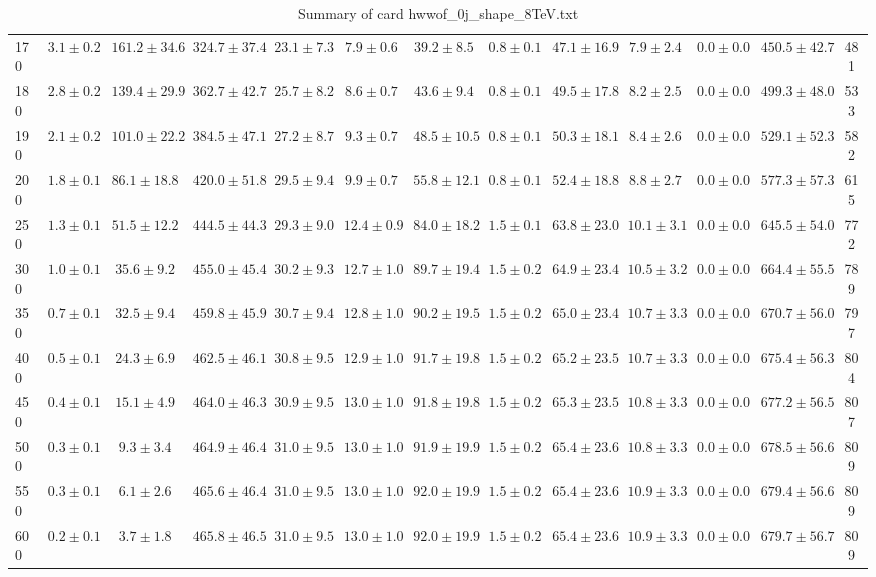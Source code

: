 \begin{table}
{\begin{center}
\begin{tabular}{l | c c | c c c c c c c c  | c c}
170 & $3.1\pm0.2$ & $161.2\pm34.6$ & $324.7\pm37.4$ & $23.1\pm7.3$ & $7.9\pm0.6$ & $39.2\pm8.5$ & $0.8\pm0.1$ & $47.1\pm16.9$ & $7.9\pm2.4$ & $0.0\pm0.0$ & $450.5\pm42.7$ & 481 \\
180 & $2.8\pm0.2$ & $139.4\pm29.9$ & $362.7\pm42.7$ & $25.7\pm8.2$ & $8.6\pm0.7$ & $43.6\pm9.4$ & $0.8\pm0.1$ & $49.5\pm17.8$ & $8.2\pm2.5$ & $0.0\pm0.0$ & $499.3\pm48.0$ & 533 \\
190 & $2.1\pm0.2$ & $101.0\pm22.2$ & $384.5\pm47.1$ & $27.2\pm8.7$ & $9.3\pm0.7$ & $48.5\pm10.5$ & $0.8\pm0.1$ & $50.3\pm18.1$ & $8.4\pm2.6$ & $0.0\pm0.0$ & $529.1\pm52.3$ & 582 \\
200 & $1.8\pm0.1$ & $86.1\pm18.8$ & $420.0\pm51.8$ & $29.5\pm9.4$ & $9.9\pm0.7$ & $55.8\pm12.1$ & $0.8\pm0.1$ & $52.4\pm18.8$ & $8.8\pm2.7$ & $0.0\pm0.0$ & $577.3\pm57.3$ & 615 \\
250 & $1.3\pm0.1$ & $51.5\pm12.2$ & $444.5\pm44.3$ & $29.3\pm9.0$ & $12.4\pm0.9$ & $84.0\pm18.2$ & $1.5\pm0.1$ & $63.8\pm23.0$ & $10.1\pm3.1$ & $0.0\pm0.0$ & $645.5\pm54.0$ & 772 \\
300 & $1.0\pm0.1$ & $35.6\pm9.2$ & $455.0\pm45.4$ & $30.2\pm9.3$ & $12.7\pm1.0$ & $89.7\pm19.4$ & $1.5\pm0.2$ & $64.9\pm23.4$ & $10.5\pm3.2$ & $0.0\pm0.0$ & $664.4\pm55.5$ & 789 \\
350 & $0.7\pm0.1$ & $32.5\pm9.4$ & $459.8\pm45.9$ & $30.7\pm9.4$ & $12.8\pm1.0$ & $90.2\pm19.5$ & $1.5\pm0.2$ & $65.0\pm23.4$ & $10.7\pm3.3$ & $0.0\pm0.0$ & $670.7\pm56.0$ & 797 \\
400 & $0.5\pm0.1$ & $24.3\pm6.9$ & $462.5\pm46.1$ & $30.8\pm9.5$ & $12.9\pm1.0$ & $91.7\pm19.8$ & $1.5\pm0.2$ & $65.2\pm23.5$ & $10.7\pm3.3$ & $0.0\pm0.0$ & $675.4\pm56.3$ & 804 \\
450 & $0.4\pm0.1$ & $15.1\pm4.9$ & $464.0\pm46.3$ & $30.9\pm9.5$ & $13.0\pm1.0$ & $91.8\pm19.8$ & $1.5\pm0.2$ & $65.3\pm23.5$ & $10.8\pm3.3$ & $0.0\pm0.0$ & $677.2\pm56.5$ & 807 \\
500 & $0.3\pm0.1$ & $9.3\pm3.4$ & $464.9\pm46.4$ & $31.0\pm9.5$ & $13.0\pm1.0$ & $91.9\pm19.9$ & $1.5\pm0.2$ & $65.4\pm23.6$ & $10.8\pm3.3$ & $0.0\pm0.0$ & $678.5\pm56.6$ & 809 \\
550 & $0.3\pm0.1$ & $6.1\pm2.6$ & $465.6\pm46.4$ & $31.0\pm9.5$ & $13.0\pm1.0$ & $92.0\pm19.9$ & $1.5\pm0.2$ & $65.4\pm23.6$ & $10.9\pm3.3$ & $0.0\pm0.0$ & $679.4\pm56.6$ & 809 \\
600 & $0.2\pm0.1$ & $3.7\pm1.8$ & $465.8\pm46.5$ & $31.0\pm9.5$ & $13.0\pm1.0$ & $92.0\pm19.9$ & $1.5\pm0.2$ & $65.4\pm23.6$ & $10.9\pm3.3$ & $0.0\pm0.0$ & $679.7\pm56.7$ & 809 \\
\hline
\end{tabular}
\end{center}
}
\caption{Summary of card hwwof\_0j\_shape\_8TeV.txt}
\end{table}

